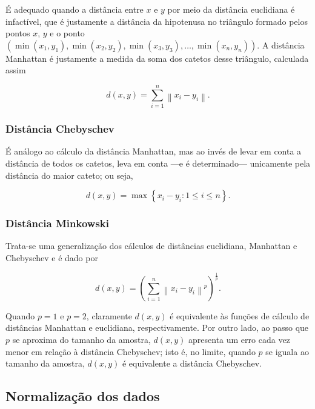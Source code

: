 \documentclass[10pt,a4paper,twocolumn]{article}
\newcommand{\chaves}[1] {{\left \{ {#1} \right \}}}
\newcommand{\parenteses}[1] {\left ( {#1} \right )}
\newcommand{\barras}[1] {{\left \| {#1} \right \|}}
\begin{document}
    É adequado quando a distância entre $x$ e $y$ por meio da distância
    euclidiana é infactível, que é justamente a distância da hipotenusa no
    triângulo formado pelos pontos $x$, $y$ e o ponto
    $(\min(x_1, y_1), \min(x_2, y_2), \min(x_3, y_3), \ldots, \min(x_n, y_n))$.
    A distância Manhattan é justamente a medida da soma dos catetos desse
    triângulo, calculada assim

    \begin{equation*}
      d(x, y) = \sum_{i=1}^n \barras{x_i - y_i}.
    \end{equation*}

    \subsubsection*{Distância Chebyschev}

    É análogo ao cálculo da distância Manhattan, mas ao invés de levar em
    conta a distância de todos os catetos, leva em conta ---e é determinado---
    unicamente pela distância do maior cateto; ou seja,

    \begin{equation*}
      d(x, y) = \max \chaves{x_i - y_i \colon 1 \leq i \leq n}.
    \end{equation*}

    \subsubsection*{Distância Minkowski}

    Trata-se uma generalização dos cálculos de distâncias euclidiana, Manhattan
    e Chebyschev e é dado por

    \begin{equation*}
      d(x, y) = \parenteses{\sum_{i=1}^n \barras{x_i - y_i}^p}^{\frac{1}{p}}.
    \end{equation*}
    
    Quando $p=1$ e $p=2$, claramente $d(x, y)$ é equivalente às funções de
    cálculo de distâncias Manhattan e euclidiana, respectivamente. Por outro
    lado, ao passo que $p$ se aproxima do tamanho da amostra, $d(x, y)$
    apresenta um erro cada vez menor em relação à distância Chebyschev; isto é,
    no limite, quando $p$ se iguala ao tamanho da amostra, $d(x, y)$ é
    equivalente a distância Chebyschev.

    \subsection{Normalização dos dados}
\end{document}

